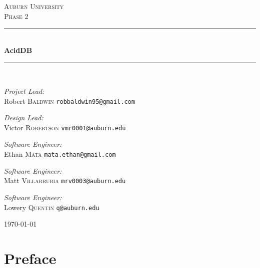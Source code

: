 \documentclass[a4paper]{report}
\newcommand{\HRule}{\rule{\linewidth}{0.5mm}}
\begin{document}
\begin{titlepage}
\begin{center}

\textsc{\LARGE Auburn University}\\[1.5cm]

\textsc{\Large Phase 2}\\[0.5cm]

\HRule \\[0.4cm]
{ \huge \bfseries AcidDB \\[0.4cm] }
\HRule \\[1.5cm]

\begin{minipage}{0.5\textwidth}
	\begin{flushleft} \large
		\emph{Project Lead:}\\
		Robert \textsc{Baldwin} \texttt{robbaldwin95@gmail.com}
	\end{flushleft}
	\begin{flushleft} \large
		\emph{Design Lead:}\\
		Victor \textsc{Robertson} \texttt{vmr0001@auburn.edu}
	\end{flushleft}
\end{minipage}
\begin{minipage}{0.3\textwidth}
	\begin{flushleft} \large
		\emph{Software Engineer:}\\
		Ethan \textsc{Mata} \texttt{mata.ethan@gmail.com}
	\end{flushleft}
	\begin{flushleft} \large
		\emph{Software Engineer:}\\
		Matt \textsc{Villarrubia} \texttt{mrv0003@auburn.edu}
	\end{flushleft}
	\begin{flushleft} \large
		\emph{Software Engineer:}\\
		Lowery \textsc{Quentin} \texttt{q@auburn.edu}
	\end{flushleft}
\end{minipage}

\vfill

{\large \today}

\end{center}
\end{titlepage}

\tableofcontents

\chapter{Preface}
\end{document}
